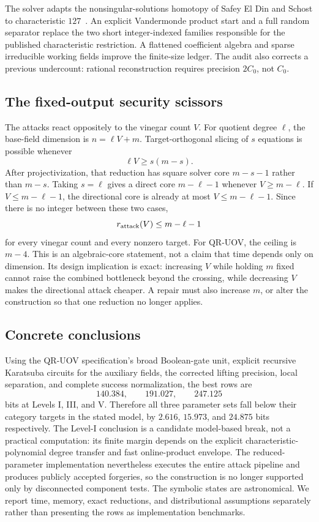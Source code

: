 \documentclass[11pt,a4paper]{article}
\theoremstyle{definition}
\theoremstyle{remark}
\begin{document}
The solver adapts the nonsingular-solutions homotopy of Safey El Din and Schost
to characteristic $127$~\cite{SafeySchost2018}.  An explicit Vandermonde
product start and a full random separator replace the two short
integer-indexed families responsible for the published characteristic
restriction.  A flattened coefficient algebra and sparse irreducible working
fields improve the finite-size ledger.  The audit also corrects a previous
undercount: rational reconstruction requires precision $2C_0$, not $C_0$.

\subsection*{The fixed-output security scissors}
The attacks react oppositely to the vinegar count $V$.  For quotient degree
$\ell$, the base-field dimension is $n=\ell V+m$.  Target-orthogonal slicing
of $s$ equations is possible whenever
\[
 \ell V\ge s(m-s).
\]
After projectivization, that reduction has square solver core $m-s-1$ rather
than $m-s$.  Taking $s=\ell$ gives a direct core $m-\ell-1$ whenever
$V\ge m-\ell$.  If $V\le m-\ell-1$, the directional core is already at most
$V\le m-\ell-1$.  Since there is no integer between these two cases,
\[
 r_{\rm attack}(V)\le m-\ell-1
\]
for every vinegar count and every nonzero target.  For QR-UOV, the ceiling is
$m-4$.  This is an algebraic-core statement, not a claim that time depends
only on dimension.  Its design implication is exact: increasing $V$ while
holding $m$ fixed cannot raise the combined bottleneck beyond the crossing,
while decreasing $V$ makes the directional attack cheaper.  A repair must
also increase $m$, or alter the construction so that one reduction no longer
applies.

\subsection*{Concrete conclusions}
Using the QR-UOV specification's broad Boolean-gate unit, explicit recursive
Karatsuba circuits for the auxiliary fields, the corrected lifting precision,
local separation, and complete success normalization, the best rows are
\[
 140.384,\qquad191.027,\qquad247.125
\]
bits at Levels I, III, and V.  Therefore all three parameter sets fall below
their category targets in the stated model, by $2.616$, $15.973$, and $24.875$
bits respectively.  The Level-I conclusion is a candidate model-based break,
not a practical computation: its finite margin depends on the explicit
characteristic-polynomial degree transfer and fast online-product envelope.
The reduced-parameter implementation nevertheless executes the entire attack
pipeline and produces publicly accepted forgeries, so the construction is no
longer supported only by disconnected component tests.
The symbolic states are astronomical.  We report time, memory, exact
reductions, and distributional assumptions separately rather than presenting
the rows as implementation benchmarks.
\end{document}
